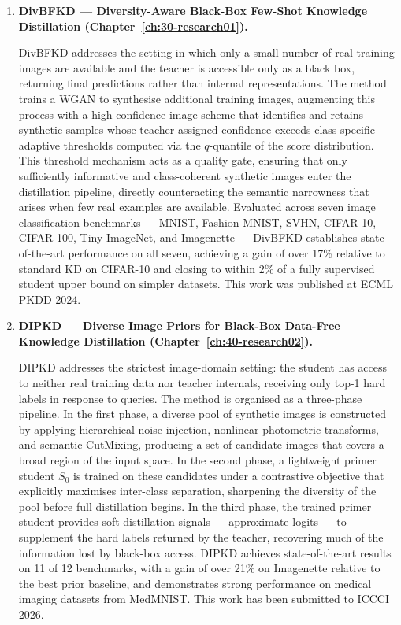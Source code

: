 \begin{enumerate}

  \item \textbf{DivBFKD — Diversity-Aware Black-Box Few-Shot Knowledge Distillation (Chapter~\ref{ch:30-research01}).}
    \begin{foldable}
      DivBFKD addresses the setting in which only a small number of real training images are available and the teacher is accessible only as a black box, returning final predictions rather than internal representations.
      The method trains a \ac{WGAN} to synthesise additional training images, augmenting this process with a high-confidence image scheme that identifies and retains synthetic samples whose teacher-assigned confidence exceeds class-specific adaptive thresholds computed via the $q$-quantile of the score distribution.
      This threshold mechanism acts as a quality gate, ensuring that only sufficiently informative and class-coherent synthetic images enter the distillation pipeline, directly counteracting the semantic narrowness that arises when few real examples are available.
      Evaluated across seven image classification benchmarks — MNIST, Fashion-MNIST, SVHN, CIFAR-10, CIFAR-100, Tiny-ImageNet, and Imagenette — DivBFKD establishes state-of-the-art performance on all seven, achieving a gain of over 17\% relative to standard \ac{KD} on CIFAR-10 and closing to within 2\% of a fully supervised student upper bound on simpler datasets.
      This work was published at ECML PKDD 2024.
    \end{foldable}

  \item \textbf{DIPKD — Diverse Image Priors for Black-Box Data-Free Knowledge Distillation (Chapter~\ref{ch:40-research02}).}
    \begin{foldable}
      DIPKD addresses the strictest image-domain setting: the student has access to neither real training data nor teacher internals, receiving only top-1 hard labels in response to queries.
      The method is organised as a three-phase pipeline.
      In the first phase, a diverse pool of synthetic images is constructed by applying hierarchical noise injection, nonlinear photometric transforms, and semantic CutMixing, producing a set of candidate images that covers a broad region of the input space.
      In the second phase, a lightweight primer student $S_0$ is trained on these candidates under a contrastive objective that explicitly maximises inter-class separation, sharpening the diversity of the pool before full distillation begins.
      In the third phase, the trained primer student provides soft distillation signals — approximate logits — to supplement the hard labels returned by the teacher, recovering much of the information lost by black-box access.
      DIPKD achieves state-of-the-art results on 11 of 12 benchmarks, with a gain of over 21\% on Imagenette relative to the best prior baseline, and demonstrates strong performance on medical imaging datasets from MedMNIST.
      This work has been submitted to ICCCI 2026.
    \end{foldable}


\end{enumerate}
